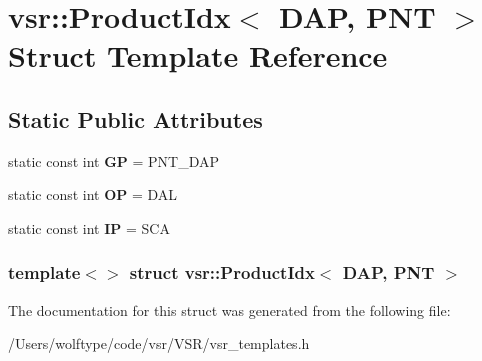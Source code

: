 \hypertarget{structvsr_1_1_product_idx_3_01_d_a_p_00_01_p_n_t_01_4}{\section{vsr\-:\-:Product\-Idx$<$ D\-A\-P, P\-N\-T $>$ Struct Template Reference}
\label{structvsr_1_1_product_idx_3_01_d_a_p_00_01_p_n_t_01_4}
}
\subsection*{Static Public Attributes}
\begin{DoxyCompactItemize}
\item 
\hypertarget{structvsr_1_1_product_idx_3_01_d_a_p_00_01_p_n_t_01_4_a73cd06782a4d53cbdf6632d268f8aecd}{static const int {\bfseries G\-P} = P\-N\-T\-\_\-\-D\-A\-P}\label{structvsr_1_1_product_idx_3_01_d_a_p_00_01_p_n_t_01_4_a73cd06782a4d53cbdf6632d268f8aecd}

\item 
\hypertarget{structvsr_1_1_product_idx_3_01_d_a_p_00_01_p_n_t_01_4_a457faa173e757cbd0169ab167c75d76f}{static const int {\bfseries O\-P} = D\-A\-L}\label{structvsr_1_1_product_idx_3_01_d_a_p_00_01_p_n_t_01_4_a457faa173e757cbd0169ab167c75d76f}

\item 
\hypertarget{structvsr_1_1_product_idx_3_01_d_a_p_00_01_p_n_t_01_4_a113e96b442e3de86d83e55678aceeea6}{static const int {\bfseries I\-P} = S\-C\-A}\label{structvsr_1_1_product_idx_3_01_d_a_p_00_01_p_n_t_01_4_a113e96b442e3de86d83e55678aceeea6}

\end{DoxyCompactItemize}
\subsubsection*{template$<$$>$ struct vsr\-::\-Product\-Idx$<$ D\-A\-P, P\-N\-T $>$}



The documentation for this struct was generated from the following file\-:\begin{DoxyCompactItemize}
\item 
/\-Users/wolftype/code/vsr/\-V\-S\-R/vsr\-\_\-templates.\-h\end{DoxyCompactItemize}
